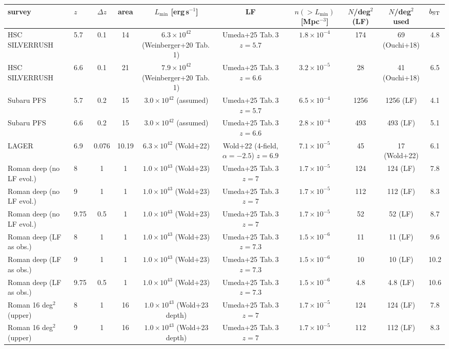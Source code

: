 \begin{tabular}{llcccccccc}
\toprule
survey & $z$ & $\Delta z$ & area & $L_{\min}$ [erg\,s$^{-1}$] & LF & $n(>L_{\min})$ [Mpc$^{-3}$] & $N$/deg$^2$ (LF) & $N$/deg$^2$ used & $b_{\rm ST}$ \\
\midrule
HSC SILVERRUSH & 5.7 & 0.1 & 14 & $6.3\times10^{42}$ (Weinberger+20 Tab.\,1) & Umeda+25 Tab.\,3 $z=5.7$ & $1.8\times10^{-4}$ & 174 & 69 (Ouchi+18) & 4.8 \\
HSC SILVERRUSH & 6.6 & 0.1 & 21 & $7.9\times10^{42}$ (Weinberger+20 Tab.\,1) & Umeda+25 Tab.\,3 $z=6.6$ & $3.2\times10^{-5}$ & 28 & 41 (Ouchi+18) & 6.5 \\
Subaru PFS & 5.7 & 0.2 & 15 & $3.0\times10^{42}$ (assumed) & Umeda+25 Tab.\,3 $z=5.7$ & $6.5\times10^{-4}$ & 1256 & 1256 (LF) & 4.1 \\
Subaru PFS & 6.6 & 0.2 & 15 & $3.0\times10^{42}$ (assumed) & Umeda+25 Tab.\,3 $z=6.6$ & $2.8\times10^{-4}$ & 493 & 493 (LF) & 5.1 \\
LAGER & 6.9 & 0.076 & 10.19 & $6.3\times10^{42}$ (Wold+22) & Wold+22 (4-field, $\alpha=-2.5$) $z=6.9$ & $7.1\times10^{-5}$ & 45 & 17 (Wold+22) & 6.1 \\
Roman deep (no LF evol.) & 8 & 1 & 1 & $1.0\times10^{43}$ (Wold+23) & Umeda+25 Tab.\,3 $z=7$ & $1.7\times10^{-5}$ & 124 & 124 (LF) & 7.8 \\
Roman deep (no LF evol.) & 9 & 1 & 1 & $1.0\times10^{43}$ (Wold+23) & Umeda+25 Tab.\,3 $z=7$ & $1.7\times10^{-5}$ & 112 & 112 (LF) & 8.3 \\
Roman deep (no LF evol.) & 9.75 & 0.5 & 1 & $1.0\times10^{43}$ (Wold+23) & Umeda+25 Tab.\,3 $z=7$ & $1.7\times10^{-5}$ & 52 & 52 (LF) & 8.7 \\
Roman deep (LF as obs.) & 8 & 1 & 1 & $1.0\times10^{43}$ (Wold+23) & Umeda+25 Tab.\,3 $z=7.3$ & $1.5\times10^{-6}$ & 11 & 11 (LF) & 9.6 \\
Roman deep (LF as obs.) & 9 & 1 & 1 & $1.0\times10^{43}$ (Wold+23) & Umeda+25 Tab.\,3 $z=7.3$ & $1.5\times10^{-6}$ & 10 & 10 (LF) & 10.2 \\
Roman deep (LF as obs.) & 9.75 & 0.5 & 1 & $1.0\times10^{43}$ (Wold+23) & Umeda+25 Tab.\,3 $z=7.3$ & $1.5\times10^{-6}$ & 4.8 & 4.8 (LF) & 10.6 \\
Roman 16 deg$^2$ (upper) & 8 & 1 & 16 & $1.0\times10^{43}$ (Wold+23 depth) & Umeda+25 Tab.\,3 $z=7$ & $1.7\times10^{-5}$ & 124 & 124 (LF) & 7.8 \\
Roman 16 deg$^2$ (upper) & 9 & 1 & 16 & $1.0\times10^{43}$ (Wold+23 depth) & Umeda+25 Tab.\,3 $z=7$ & $1.7\times10^{-5}$ & 112 & 112 (LF) & 8.3 \\

\end{tabular}
